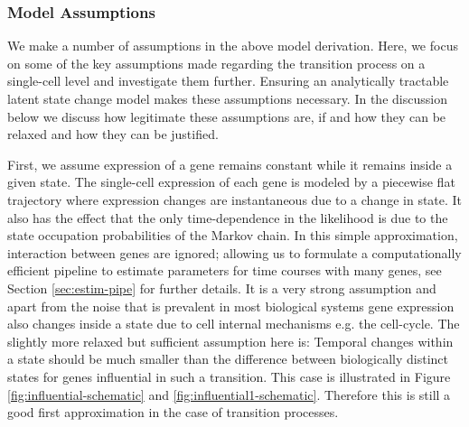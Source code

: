 \subsubsection{Model Assumptions}
\label{sec:model-assumptions}

We make a number of assumptions in the above model derivation. Here, we focus on some of the key assumptions made regarding the transition process on a single-cell level and investigate them further. Ensuring an analytically tractable latent state change model makes these assumptions necessary. In the discussion below we discuss how legitimate these assumptions are, if and how they can be relaxed and how they can be justified.

First, we assume expression of a gene remains constant while it remains inside a given state. The single-cell expression of each gene is modeled by a piecewise flat trajectory where expression changes are instantaneous due to a change in state. It also has the effect that the only time-dependence in the likelihood is due to the state occupation probabilities of the Markov chain. In this simple approximation, interaction between genes are ignored; allowing us to formulate a computationally efficient pipeline to estimate parameters for time courses with many genes, see Section \ref{sec:estim-pipe} for further details. It is a very strong assumption and apart from the noise that is prevalent in most biological systems gene expression also changes inside a state due to cell internal mechanisms e.g. the cell-cycle. The slightly more relaxed but sufficient assumption here is: Temporal changes within a state should be much smaller than the difference between biologically distinct states for genes influential in such a transition. This case is illustrated in Figure \ref{fig:influential-schematic} and \ref{fig:influential1-schematic}. Therefore this is still a good first approximation in the case of transition processes. 

